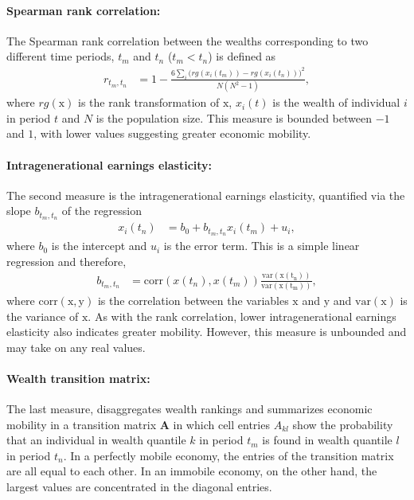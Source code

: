 \documentclass[11pt]{article}
\numberwithin{equation}{section}
\begin{document}
 

\paragraph{Spearman rank correlation:} The Spearman rank correlation between the wealths corresponding to two different time periods, $t_m$ and $t_n$ ($t_m < t_n$) is defined as
\begin{align*}
    r_{t_m,t_n} &= 1 - \frac{6\sum_i \big(rg(x_i(t_m)) - rg(x_i(t_n))\big)^2}{N(N^2-1)},
\end{align*}
where $rg(\mathrm{x})$ is the rank transformation of $\mathrm{x}$, $x_i(t)$ is the wealth of individual $i$ in period $t$ and $N$ is the population size. This measure is bounded between $-1$ and $1$, with lower values suggesting greater economic mobility.

\paragraph{Intragenerational earnings elasticity:} The second measure is the intragenerational earnings elasticity, quantified via the slope $b_{t_m,t_n}$ of the regression
\begin{align*}
    x_i(t_n) &= b_0 + b_{t_m,t_n} x_i(t_m) + u_i,
\end{align*}
where $b_0$ is the intercept and $u_i$ is the error term. This is a simple linear regression and therefore,
\begin{align}
    b_{t_m,t_n} &= \mathrm{corr}(x(t_n),x(t_m)) \frac{\mathrm{var(x(t_n))}}{\mathrm{var(x(t_m))}},
    \label{eq:iee-estimation}
\end{align}
where $\mathrm{corr}(\mathrm{x},\mathrm{y})$ is the correlation between the variables $\mathrm{x}$ and $\mathrm{y}$ and $\mathrm{var}(\mathrm{x})$ is the variance of $\mathrm{x}$. As with the rank correlation, lower intragenerational earnings elasticity also indicates greater mobility. However, this measure is unbounded and may take on any real values.

\paragraph{Wealth transition matrix:} The last measure, disaggregates wealth rankings and summarizes economic mobility in a
transition matrix $\mathbf{A}$ in which cell entries $A_{kl}$ show the probability that an individual in wealth quantile $k$ in period $t_m$ is found in wealth quantile $l$ in period $t_n$. In a perfectly mobile economy, the entries of the transition matrix are all equal to each other. In an immobile economy, on the other hand, the largest values are concentrated in the diagonal entries.
\end{document}
